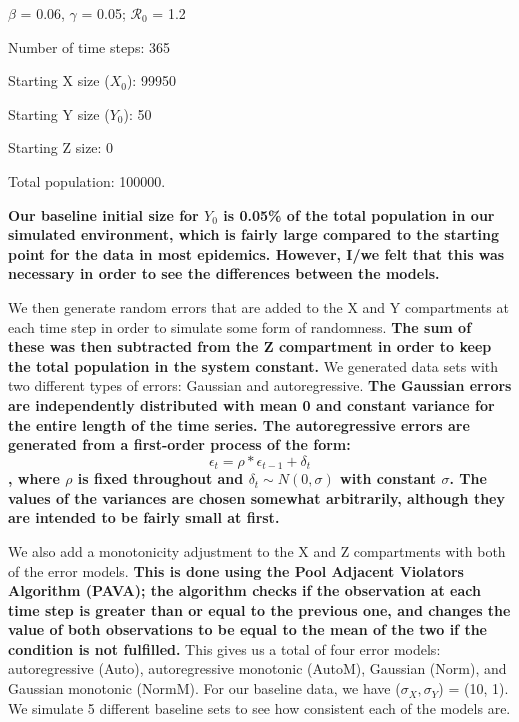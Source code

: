 \documentclass[12pt]{article}
\newcommand{\rr}{\ensuremath{\mathcal{R}_0}}
\begin{document}
\begin{center}
	
	$\beta$ = 0.06, $\gamma$ = 0.05; $\rr$ = 1.2
	
	Number of time steps: 365
	
	Starting X size ($X_0$): 99950
	
	Starting Y size ($Y_0$): 50
	
	Starting Z size: 0
	
	Total population: 100000.
	
\end{center}


\textbf{Our baseline initial size for $Y_0$ is 0.05\% of the total population in our simulated environment, which is fairly large compared to the starting point for the data in most epidemics. However, I/we felt that this was necessary in order to see the differences between the models.}

We then generate random errors that are added to the X and Y compartments at each time step in order to simulate some form of randomness. \textbf{The sum of these was then subtracted from the Z compartment in order to keep the total population in the system constant.} We generated data sets with two different types of errors: Gaussian and autoregressive. \textbf{The Gaussian errors are independently distributed with mean 0 and constant variance for the entire length of the time series. The autoregressive errors are generated from a first-order process of the form: $$ \epsilon_{t} = \rho * \epsilon_{t-1} + \delta_{t}$$, where $\rho$ is fixed throughout and $\delta_{t} \sim N(0, \sigma)$ with constant $\sigma$. The values of the variances are chosen somewhat arbitrarily, although they are intended to be fairly small at first.} 

We also add a monotonicity adjustment to the X and Z compartments with both of the error models. \textbf{This is done using the Pool Adjacent Violators Algorithm (PAVA); the algorithm checks if the observation at each time step is greater than or equal to the previous one, and changes the value of both observations to be equal to the mean of the two if the condition is not fulfilled.} This gives us a total of four error models: autoregressive (Auto), autoregressive monotonic (AutoM), Gaussian (Norm), and Gaussian monotonic (NormM). For our baseline data, we have ($\sigma_X, \sigma_Y$) = (10, 1). We simulate 5 different baseline sets to see how consistent each of the models are.
\end{document}
